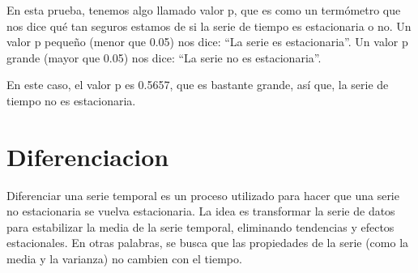 \documentclass[
]{book}
\begin{document}
En esta prueba, tenemos algo llamado valor p, que es como un termómetro que nos dice qué tan seguros estamos de si la serie de tiempo es estacionaria o no. Un valor p pequeño (menor que 0.05) nos dice: ``La serie es estacionaria''. Un valor p grande (mayor que 0.05) nos dice: ``La serie no es estacionaria''.

En este caso, el valor p es 0.5657, que es bastante grande, así que, la serie de tiempo no es estacionaria.

\hypertarget{diferenciacion}{%
\chapter{Diferenciacion}\label{diferenciacion}}

Diferenciar una serie temporal es un proceso utilizado para hacer que una serie no estacionaria se vuelva estacionaria. La idea es transformar la serie de datos para estabilizar la media de la serie temporal, eliminando tendencias y efectos estacionales. En otras palabras, se busca que las propiedades de la serie (como la media y la varianza) no cambien con el tiempo.
\end{document}
